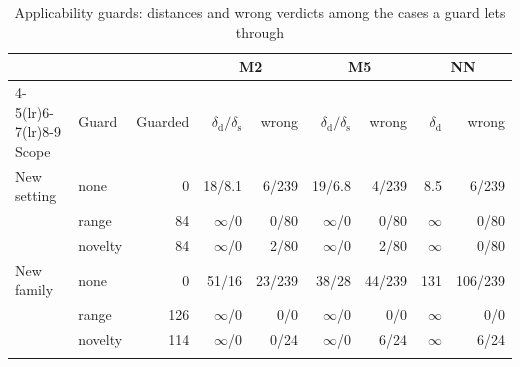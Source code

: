 \documentclass[pdflatex,sn-basic]{sn-jnl}
\newcommand{\tabsize}{\fontsize{8}{9.5}\selectfont}
\begin{document}

\begin{table}[tbp]
\tabsize
\setlength{\tabcolsep}{3.5pt}
\caption{Applicability guards: distances and wrong verdicts among the cases a guard lets through}\label{tab:guard}
\begin{tabular}{@{}llrrrrrrr@{}}
\toprule
 & & & \multicolumn{2}{c}{M2} & \multicolumn{2}{c}{M5} & \multicolumn{2}{c}{NN} \\
\cmidrule(lr){4-5}\cmidrule(lr){6-7}\cmidrule(lr){8-9}
Scope & Guard & Guarded & $\delta_\mathrm{d}/\delta_\mathrm{s}$ & wrong & $\delta_\mathrm{d}/\delta_\mathrm{s}$ & wrong & $\delta_\mathrm{d}$ & wrong \\
\midrule
New setting & none & 0 & 18/8.1 & 6/239 & 19/6.8 & 4/239 & 8.5 & 6/239 \\
 & range & 84 & $\infty$/0 & 0/80 & $\infty$/0 & 0/80 & $\infty$ & 0/80 \\
 & novelty & 84 & $\infty$/0 & 2/80 & $\infty$/0 & 2/80 & $\infty$ & 0/80 \\
New family & none & 0 & 51/16 & 23/239 & 38/28 & 44/239 & 131 & 106/239 \\
 & range & 126 & $\infty$/0 & 0/0 & $\infty$/0 & 0/0 & $\infty$ & 0/0 \\
 & novelty & 114 & $\infty$/0 & 0/24 & $\infty$/0 & 6/24 & $\infty$ & 6/24 \\
\botrule
\end{tabular}
\end{table}
\end{document}
